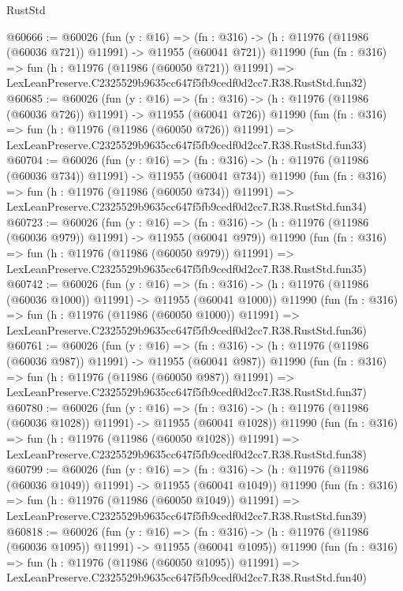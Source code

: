 \begin{lexlean}{RustStd}
\begin{coremodule}
@60666 := @60026
    (fun (y : @16) =>
    (fn : @316) -> (h : @11976 (@11986 (@60036 @721)) @11991) -> @11955 (@60041 @721))
    @11990
    (fun (fn : @316) =>
    fun (h : @11976 (@11986 (@60050 @721)) @11991) =>
    LexLeanPreserve.C2325529b9635cc647f5fb9cedf0d2cc7.R38.RustStd.fun32)
@60685 := @60026
    (fun (y : @16) =>
    (fn : @316) -> (h : @11976 (@11986 (@60036 @726)) @11991) -> @11955 (@60041 @726))
    @11990
    (fun (fn : @316) =>
    fun (h : @11976 (@11986 (@60050 @726)) @11991) =>
    LexLeanPreserve.C2325529b9635cc647f5fb9cedf0d2cc7.R38.RustStd.fun33)
@60704 := @60026
    (fun (y : @16) =>
    (fn : @316) -> (h : @11976 (@11986 (@60036 @734)) @11991) -> @11955 (@60041 @734))
    @11990
    (fun (fn : @316) =>
    fun (h : @11976 (@11986 (@60050 @734)) @11991) =>
    LexLeanPreserve.C2325529b9635cc647f5fb9cedf0d2cc7.R38.RustStd.fun34)
@60723 := @60026
    (fun (y : @16) =>
    (fn : @316) -> (h : @11976 (@11986 (@60036 @979)) @11991) -> @11955 (@60041 @979))
    @11990
    (fun (fn : @316) =>
    fun (h : @11976 (@11986 (@60050 @979)) @11991) =>
    LexLeanPreserve.C2325529b9635cc647f5fb9cedf0d2cc7.R38.RustStd.fun35)
@60742 := @60026
    (fun (y : @16) =>
    (fn : @316) -> (h : @11976 (@11986 (@60036 @1000)) @11991) -> @11955 (@60041 @1000))
    @11990
    (fun (fn : @316) =>
    fun (h : @11976 (@11986 (@60050 @1000)) @11991) =>
    LexLeanPreserve.C2325529b9635cc647f5fb9cedf0d2cc7.R38.RustStd.fun36)
@60761 := @60026
    (fun (y : @16) =>
    (fn : @316) -> (h : @11976 (@11986 (@60036 @987)) @11991) -> @11955 (@60041 @987))
    @11990
    (fun (fn : @316) =>
    fun (h : @11976 (@11986 (@60050 @987)) @11991) =>
    LexLeanPreserve.C2325529b9635cc647f5fb9cedf0d2cc7.R38.RustStd.fun37)
@60780 := @60026
    (fun (y : @16) =>
    (fn : @316) -> (h : @11976 (@11986 (@60036 @1028)) @11991) -> @11955 (@60041 @1028))
    @11990
    (fun (fn : @316) =>
    fun (h : @11976 (@11986 (@60050 @1028)) @11991) =>
    LexLeanPreserve.C2325529b9635cc647f5fb9cedf0d2cc7.R38.RustStd.fun38)
@60799 := @60026
    (fun (y : @16) =>
    (fn : @316) -> (h : @11976 (@11986 (@60036 @1049)) @11991) -> @11955 (@60041 @1049))
    @11990
    (fun (fn : @316) =>
    fun (h : @11976 (@11986 (@60050 @1049)) @11991) =>
    LexLeanPreserve.C2325529b9635cc647f5fb9cedf0d2cc7.R38.RustStd.fun39)
@60818 := @60026
    (fun (y : @16) =>
    (fn : @316) -> (h : @11976 (@11986 (@60036 @1095)) @11991) -> @11955 (@60041 @1095))
    @11990
    (fun (fn : @316) =>
    fun (h : @11976 (@11986 (@60050 @1095)) @11991) =>
    LexLeanPreserve.C2325529b9635cc647f5fb9cedf0d2cc7.R38.RustStd.fun40)

\end{coremodule}
\end{lexlean}

